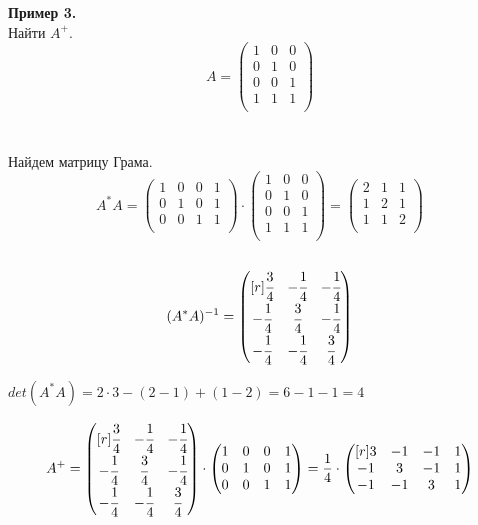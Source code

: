 \documentclass[12pt]{article}
\theoremstyle{definition}
\numberwithin{equation}{section}
\begin{document}
\textbf{Пример 3.}\\
Найти $A^+$.\\
\[A = \begin{pmatrix}
1 & 0 & 0 \\         
0 & 1 & 0 \\
0 & 0 & 1 \\
1 & 1 & 1 \\
\end{pmatrix}\]\\
\\
Найдем матрицу Грама.\\
\[A^*A = \begin{pmatrix}
1 & 0 & 0 & 1 \\         
0 & 1 & 0 & 1\\
0 & 0 & 1 & 1\\
\end{pmatrix} \cdot \begin{pmatrix}
1 & 0 & 0 \\         
0 & 1 & 0 \\
0 & 0 & 1 \\
1 & 1 & 1 \\
\end{pmatrix} = \begin{pmatrix}
2 & 1 & 1 \\         
1 & 2 & 1 \\
1 & 1 & 2 \\
\end{pmatrix}\]\\
\[(A^*A)^{-1} = \begin{pmatrix}[r]
\cfrac{3}{4} & -\cfrac{1}{4} & -\cfrac{1}{4} \\         
-\cfrac{1}{4} & \cfrac{3}{4} & -\cfrac{1}{4} \\
-\cfrac{1}{4} & -\cfrac{1}{4} & \cfrac{3}{4} \\
\end{pmatrix}\]
\begin{center}$det (A^*A)=2\cdot 3-(2-1)+(1-2)=6-1-1=4$\end{center}
\[A^+ = \begin{pmatrix}[r]
\cfrac{3}{4} & -\cfrac{1}{4} & -\cfrac{1}{4} \\         
-\cfrac{1}{4} & \cfrac{3}{4} & -\cfrac{1}{4} \\
-\cfrac{1}{4} & -\cfrac{1}{4} & \cfrac{3}{4} \\
\end{pmatrix} \cdot \begin{pmatrix}
1 & 0 & 0 & 1 \\         
0 & 1 & 0 & 1\\
0 & 0 & 1 & 1\\
\end{pmatrix} = \frac{1}{4} \cdot \begin{pmatrix}[r]
3 & -1 & -1 & 1 \\         
-1 & 3 & - 1 & 1 \\
-1 & -1 & 3 & 1 \\
\end{pmatrix}\]\\
\end{document}
